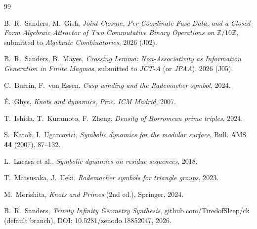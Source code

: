 \documentclass[11pt,reqno]{amsart}
\theoremstyle{plain}
\theoremstyle{definition}
\theoremstyle{remark}
\newcommand{\Z}{\mathbb{Z}}
\begin{document}
\begin{thebibliography}{99}

 B.~R.~Sanders, M.~Gish,
\emph{Joint Closure, Per-Coordinate Fuse Data, and a Closed-Form
Algebraic Attractor of Two Commutative Binary Operations on
$\Z/10\Z$}, submitted to \emph{Algebraic Combinatorics}, 2026 (J02).

 B.~R.~Sanders, B.~Mayes,
\emph{Crossing Lemma: Non-Associativity as Information Generation in
Finite Magmas}, submitted to \emph{JCT-A} (or \emph{JPAA}), 2026
(J05).

 C.~Burrin, F.~von Essen,
\emph{Cusp winding and the Rademacher symbol}, 2024.

 \'E.~Ghys,
\emph{Knots and dynamics},
\emph{Proc. ICM Madrid}, 2007.

 T.~Ishida, T.~Kuramoto, F.~Zheng,
\emph{Density of Borromean prime triples}, 2024.

 S.~Katok, I.~Ugarcovici,
\emph{Symbolic dynamics for the modular surface},
Bull. AMS \textbf{44} (2007), 87--132.

 L.~Lacasa et al.,
\emph{Symbolic dynamics on residue sequences}, 2018.

 T.~Matsusaka, J.~Ueki,
\emph{Rademacher symbols for triangle groups}, 2023.

 M.~Morishita,
\emph{Knots and Primes} (2nd ed.), Springer, 2024.

 B.~R.~Sanders,
\emph{Trinity Infinity Geometry Synthesis},
github.com/TiredofSleep/ck (default branch),
DOI: 10.5281/zenodo.18852047, 2026.

\end{thebibliography}
\end{document}
